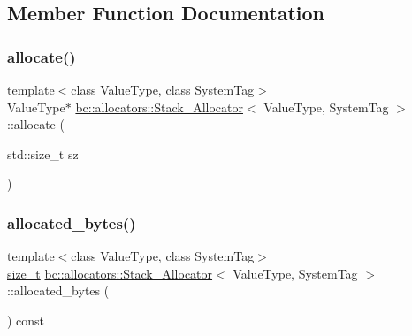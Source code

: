 \subsection{Member Function Documentation}
\mbox{\label{classbc_1_1allocators_1_1Stack__Allocator_a5d7f2cdefd27eff0ea9f2261d3625021}} 
\subsubsection{\texorpdfstring{allocate()}{allocate()}}
{\footnotesize\ttfamily template$<$class Value\+Type, class System\+Tag$>$ \\
Value\+Type$\ast$ \hyperlink{classbc_1_1allocators_1_1Stack__Allocator}{bc\+::allocators\+::\+Stack\+\_\+\+Allocator}$<$ Value\+Type, System\+Tag $>$\+::allocate (\begin{DoxyParamCaption}\item[{std\+::size\+\_\+t}]{sz }\end{DoxyParamCaption})\hspace{0.3cm}{\ttfamily [inline]}}

\mbox{\label{classbc_1_1allocators_1_1Stack__Allocator_a1642bba13b2dd208fb9c43305759cd2b}} 
\subsubsection{\texorpdfstring{allocated\+\_\+bytes()}{allocated\_bytes()}}
{\footnotesize\ttfamily template$<$class Value\+Type, class System\+Tag$>$ \\
\hyperlink{namespacebc_aaf8e3fbf99b04b1b57c4f80c6f55d3c5}{size\+\_\+t} \hyperlink{classbc_1_1allocators_1_1Stack__Allocator}{bc\+::allocators\+::\+Stack\+\_\+\+Allocator}$<$ Value\+Type, System\+Tag $>$\+::allocated\+\_\+bytes (\begin{DoxyParamCaption}{ }\end{DoxyParamCaption}) const\hspace{0.3cm}{\ttfamily [inline]}}

